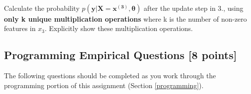 \documentclass[11pt]{article}
\numberwithin{equation}{section} %
\numberwithin{figure}{section} %
\numberwithin{table}{section} %
\def\y{\mathbf y}
\newcommand{\thetav     }{\boldsymbol \theta     }
\begin{document}
\begin{enumerate}
\begin{table}[h]
\begin{tabular}{cll}
    \bottomrule
    \end{tabular}
    \end{table}\\
    Calculate the probability $p\left(\y|\mathbf{X=x^{(3)}},\thetav\right)$ after the update step in 3., using \textbf{only k unique multiplication operations} where k is the number of non-zero features in $x_3$. Explicitly show these multiplication operations.
    \begin{solution}
    \bigskip \bigskip \bigskip \bigskip \bigskip \bigskip \bigskip \bigskip
    \bigskip \bigskip \bigskip \bigskip \bigskip \bigskip \bigskip \bigskip
    \bigskip \bigskip \bigskip \bigskip \bigskip \bigskip \bigskip \bigskip
    \end{solution}
    

 \end{enumerate}
 \clearpage
\subsection{Programming Empirical Questions [8 points]}
\label{sec:empirical}

The following questions should be completed as you work through the programming portion of this assignment (Section \ref{programming}).
\end{document}
